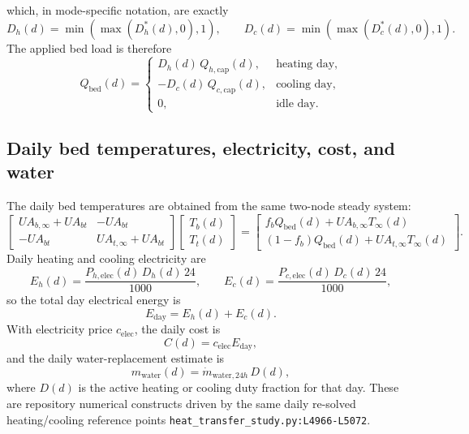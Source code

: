 \documentclass[11pt]{article}
\newcommand{\srcref}[1]{\nolinkurl{#1}}
\begin{document}
which, in mode-specific notation, are exactly
\begin{equation}
\label{eq:daily_duty_clipped}
D_h(d)=\min(\max(D_h^\ast(d),0),1),
\qquad
D_c(d)=\min(\max(D_c^\ast(d),0),1).
\end{equation}
The applied bed load is therefore
\begin{equation}
\label{eq:daily_applied_bed_load}
Q_{\mathrm{bed}}(d)=
\begin{cases}
D_h(d)\,Q_{h,\mathrm{cap}}(d), & \text{heating day},\\
-D_c(d)\,Q_{c,\mathrm{cap}}(d), & \text{cooling day},\\
0, & \text{idle day}.
\end{cases}
\end{equation}

\subsection{Daily bed temperatures, electricity, cost, and water}
The daily bed temperatures are obtained from the same two-node steady system:
\begin{equation}
\label{eq:daily_two_node_matrix}
\begin{bmatrix}
UA_{b,\infty}+UA_{bt} & -UA_{bt}\\
-UA_{bt} & UA_{t,\infty}+UA_{bt}
\end{bmatrix}
\begin{bmatrix}
T_b(d)\\
T_t(d)
\end{bmatrix}
=
\begin{bmatrix}
f_bQ_{\mathrm{bed}}(d)+UA_{b,\infty}T_\infty(d)\\
(1-f_b)Q_{\mathrm{bed}}(d)+UA_{t,\infty}T_\infty(d)
\end{bmatrix}.
\end{equation}
Daily heating and cooling electricity are
\begin{equation}
\label{eq:daily_energy_modes}
E_h(d)=\frac{P_{h,\mathrm{elec}}(d)\,D_h(d)\,24}{1000},
\qquad
E_c(d)=\frac{P_{c,\mathrm{elec}}(d)\,D_c(d)\,24}{1000},
\end{equation}
so the total day electrical energy is
\begin{equation}
\label{eq:daily_energy}
E_{\mathrm{day}}=E_h(d)+E_c(d).
\end{equation}
With electricity price \(c_{\mathrm{elec}}\), the daily cost is
\begin{equation}
\label{eq:daily_cost}
C(d)=c_{\mathrm{elec}}E_{\mathrm{day}},
\end{equation}
and the daily water-replacement estimate is
\begin{equation}
\label{eq:daily_water}
m_{\mathrm{water}}(d)=\dot m_{\mathrm{water},24h}\,D(d),
\end{equation}
where \(D(d)\) is the active heating or cooling duty fraction for that day. These are repository numerical constructs driven by the same daily re-solved heating/cooling reference points \srcref{heat_transfer_study.py:L4966-L5072}.
\end{document}
